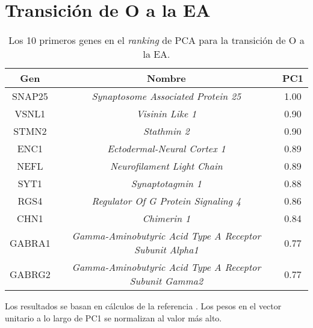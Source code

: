 
\chapter{Transición de O a la EA}\label{apx:apx7}

\begin{table}[!htb]
	\centering
	\caption{Los 10 primeros genes en el \textit{ranking} de PCA para la transición de O a la EA.}
	\label{tab:apx7}
	\begin{tabular}{|c|c|c|}
		\hline
		Gen & Nombre & PC1 \\ \hline
		
		\hline
		SNAP25 & \textit{Synaptosome Associated Protein 25} & 1.00 \\
		\hline
		VSNL1 & \textit{Visinin Like 1} & 0.90 \\
		\hline
		STMN2 & \textit{Stathmin 2} & 0.90 \\
		\hline
		ENC1 & \textit{Ectodermal-Neural Cortex 1} & 0.89 \\
		\hline
		NEFL & \textit{Neurofilament Light Chain} & 0.89 \\
		\hline
		SYT1 & \textit{Synaptotagmin 1} & 0.88 \\
		\hline
		RGS4 & \textit{Regulator Of G Protein Signaling 4} & 0.86 \\
		\hline
		CHN1 & \textit{Chimerin 1} & 0.84 \\
		\hline
		GABRA1 & \textit{Gamma-Aminobutyric Acid Type A Receptor Subunit Alpha1} & 0.77 \\
		\hline
		GABRG2 & \textit{Gamma-Aminobutyric Acid Type A Receptor Subunit Gamma2} & 0.77 \\
		\hline
		
	\end{tabular}
\end{table}

Los resultados se basan en cálculos de la referencia \cite{Gonzalez_2021}. Los pesos en el vector unitario a lo largo de PC1 se normalizan al valor más alto.
